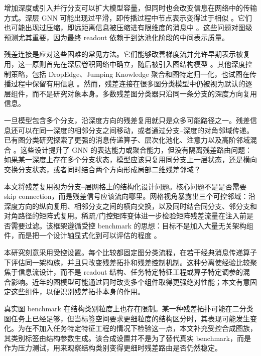 \documentclass[UTF8,10pt]{ctexart}
\let\cite\citep
\begin{document}
增加深度或引入并行分支可以扩大模型容量，但同时也会改变信息在网络中的传输方式。深层 GNN 可能出现过平滑，即传播过程中节点表示变得过于相似 \cite{li2018deeper,oono2020simple}。它们也可能出现过压缩，即远距离信息被压缩进有限维度的消息中 \cite{alon2020bottleneck,topping2021understanding}。这些问题对图级预测尤其重要，因为最终 readout 依赖于到达池化阶段的中间表示质量。

残差连接是应对这些困难的常见方法。它们能够改善梯度流并允许早期表示被复用，这一原则首先在深层卷积网络中确立，随后被引入图结构模型 \cite{he2016deep,bresson2017residual}。其他深度控制策略，包括 DropEdge、Jumping Knowledge 聚合和图特定归一化，也试图在传播过程中保留有用信息 \cite{rong2019dropedge,xu2018representation}。然而，残差连接在很多图分类模型中仍被视为默认的逐层组件，而不是研究对象本身。多数残差图分类器只沿同一条分支的深度方向复用信息。

一旦模型包含多个分支，沿深度方向的残差复用就只是众多可能路径之一。残差信息还可以在同一深度的相邻分支之间移动，或者通过分支--深度的对角邻域传递。已有图分类研究探索了更强的消息传递算子、层次化池化、注意力以及高阶邻域混合 \cite{abu2019mixhop,bianchi2020graph}。这些设计提升了 GNN 的表达能力或聚合能力，但没有隔离残差路由问题：如果某一深度上存在多个分支状态，模型应该只复用同分支上一层状态，还是横向交换分支状态，或者同时结合两个方向形成局部二维残差邻域？

本文将残差复用视为分支--层网格上的结构化设计问题。核心问题不是是否需要 skip connection，而是残差信号应该流向哪里。网格视角暴露出三个可控邻域：沿深度方向的纵向复用、相邻分支之间的横向交换，以及同时结合同分支、邻分支和对角路径的矩阵式复用。稀疏/门控矩阵变体进一步检验矩阵残差流量在注入前是否需要过滤。该框架遵循受控 benchmark 的思想：目标不是加入大量无关架构组件，而是把一个设计轴显式化到可以评估的程度 \cite{keriven2020benchmark,morris2020tudataset}。

本研究刻意采用受控设置。每个比较都固定图分类流程，在若干经典消息传递算子下评估同一架构族，并且只改变残差拓扑和残差控制机制。这种分离使经验比较聚焦于信息流设计，而不是 readout 结构、任务特定特征工程或算子特定调参的混合影响。近年的图模型可能通过同时改变多个组件取得更强绝对性能；本文有意固定这些组件，以便识别残差拓扑本身的作用。

真实图 benchmark 在结构类别粒度上也存在限制。某一种残差拓扑可能在二分类图任务上已经足够，但当标签空间要求更细粒度的结构区分时，其表现可能发生变化。为在不加入任务特定特征工程的情况下检验这一点，本文补充受控合成图族，其类别标签由结构参数生成。该合成设置并不是为了替代真实 benchmark，而是作为压力测试，用来观察结构类别变得更细时残差路由是否仍然稳定。
\end{document}

